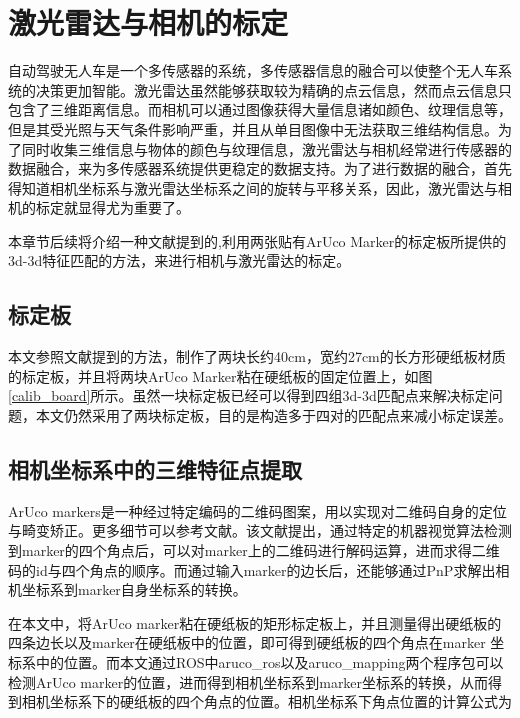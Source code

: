 \section{激光雷达与相机的标定}

自动驾驶无人车是一个多传感器的系统，多传感器信息的融合可以使整个无人车系统的决策更加智能。激光雷达虽然能够获取较为精确的点云信息，然而点云信息只包含了三维距离信息。而相机可以通过图像获得大量信息诸如颜色、纹理信息等，但是其受光照与天气条件影响严重，并且从单目图像中无法获取三维结构信息。为了同时收集三维信息与物体的颜色与纹理信息，激光雷达与相机经常进行传感器的数据融合，来为多传感器系统提供更稳定的数据支持。为了进行数据的融合，首先得知道相机坐标系与激光雷达坐标系之间的旋转与平移关系，因此，激光雷达与相机的标定就显得尤为重要了。

本章节后续将介绍一种文献提到的,利用两张贴有ArUco Marker的标定板所提供的3d-3d特征匹配的方法，来进行相机与激光雷达的标定。

\subsection{标定板}

本文参照文献提到的方法，制作了两块长约40cm，宽约27cm的长方形硬纸板材质的标定板，并且将两块ArUco Marker粘在硬纸板的固定位置上，如图\ref{calib_board}所示。虽然一块标定板已经可以得到四组3d-3d匹配点来解决标定问题，本文仍然采用了两块标定板，目的是构造多于四对的匹配点来减小标定误差。

\subsection{相机坐标系中的三维特征点提取}

ArUco markers是一种经过特定编码的二维码图案，用以实现对二维码自身的定位与畸变矫正。更多细节可以参考文献。该文献提出，通过特定的机器视觉算法检测到marker的四个角点后，可以对marker上的二维码进行解码运算，进而求得二维码的id与四个角点的顺序。而通过输入marker的边长后，还能够通过PnP求解出相机坐标系到marker自身坐标系的转换。


在本文中，将ArUco marker粘在硬纸板的矩形标定板上，并且测量得出硬纸板的四条边长以及marker在硬纸板中的位置，即可得到硬纸板的四个角点在marker 坐标系中的位置。而本文通过ROS中aruco\_ros以及aruco\_mapping两个程序包可以检测ArUco marker的位置，进而得到相机坐标系到marker坐标系的转换，从而得到相机坐标系下的硬纸板的四个角点的位置。相机坐标系下角点位置的计算公式为

